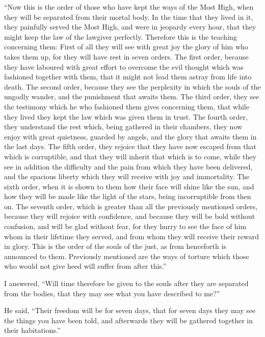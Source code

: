  ``Now this is the order of those who have kept the ways of
the Most High, when they will be separated from their mortal body.
 In the time that they lived in it, they painfully served
the Most High, and were in jeopardy every hour, that they might keep the
law of the lawgiver perfectly.  Therefore this is the
teaching concerning them:  First of all they will see with
great joy the glory of him who takes them up, for they will have rest in
seven orders.  The first order, because they have laboured
with great effort to overcome the evil thought which was fashioned
together with them, that it might not lead them astray from life into
death.  The second order, because they see the perplexity
in which the souls of the ungodly wander, and the punishment that awaits
them.  The third order, they see the testimony which he who
fashioned them gives concerning them, that while they lived they kept
the law which was given them in trust.  The fourth order,
they understand the rest which, being gathered in their chambers, they
now enjoy with great quietness, guarded by angels, and the glory that
awaits them in the last days.  The fifth order, they
rejoice that they have now escaped from that which is corruptible, and
that they will inherit that which is to come, while they see in addition
the difficulty and the pain from which they have been delivered, and the
spacious liberty which they will receive with joy and immortality.
 The sixth order, when it is shown to them how their face
will shine like the sun, and how they will be made like the light of the
stars, being incorruptible from then on.  The seventh
order, which is greater than all the previously mentioned orders,
because they will rejoice with confidence, and because they will be bold
without confusion, and will be glad without fear, for they hurry to see
the face of him whom in their lifetime they served, and from whom they
will receive their reward in glory.  This is the order of
the souls of the just, as from henceforth is announced to them.
Previously mentioned are the ways of torture which those who would not
give heed will suffer from after this.''

 I answered, ``Will time therefore be given to the souls
after they are separated from the bodies, that they may see what you
have described to me?''

 He said, ``Their freedom will be for seven days, that for
seven days they may see the things you have been told, and afterwards
they will be gathered together in their habitations.''

